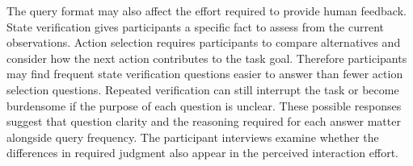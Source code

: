 The query format may also affect the effort required to provide human feedback. State verification gives participants a specific fact to assess from the current observations. Action selection requires participants to compare alternatives and consider how the next action contributes to the task goal. Therefore participants may find frequent state verification questions easier to answer than fewer action selection questions. Repeated verification can still interrupt the task or become burdensome if the purpose of each question is unclear. These possible responses suggest that question clarity and the reasoning required for each answer matter alongside query frequency. The participant interviews examine whether the differences in required judgment also appear in the perceived interaction effort.

